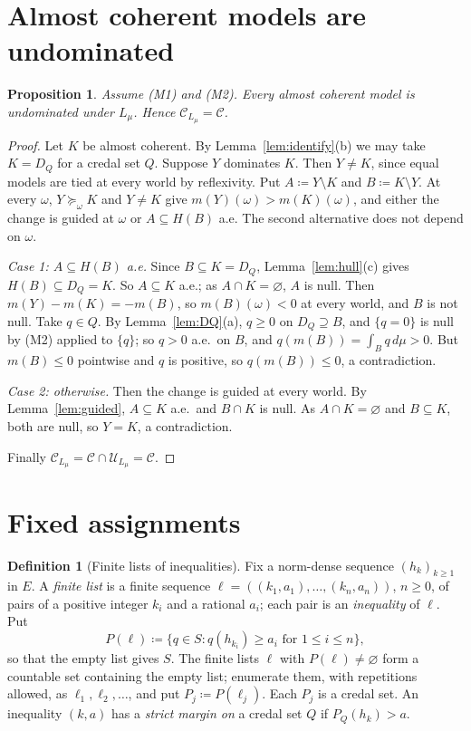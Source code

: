 \documentclass[11pt]{article}
\newtheorem{proposition}[theorem]{Proposition}
\theoremstyle{definition}
\newtheorem{definition}[theorem]{Definition}
\newcommand{\C}{\mathcal C}
\newcommand{\U}{\mathcal U}
\newcommand{\Lmu}{L_\mu}
\begin{document}
\section{Almost coherent models are undominated}\label{sec:admissibility}

\begin{proposition}\label{prop:admissible}
Assume (M1) and (M2). Every almost coherent model is undominated under $\Lmu$. Hence $\C_{\Lmu}=\C$.
\end{proposition}
\begin{proof}
Let $K$ be almost coherent. By Lemma~\ref{lem:identify}(b) we may take $K=D_Q$ for a credal set $Q$. Suppose $Y$ dominates $K$. Then $Y\ne K$, since equal models are tied at every world by reflexivity. Put $A\coloneqq Y\setminus K$ and $B\coloneqq K\setminus Y$. At every $\omega$, $Y\succeq_\omega K$ and $Y\ne K$ give $m(Y)(\omega)>m(K)(\omega)$, and either the change is guided at $\omega$ or $A\subseteq H(B)$ a.e. The second alternative does not depend on $\omega$.

\emph{Case 1: $A\subseteq H(B)$ a.e.} Since $B\subseteq K=D_Q$, Lemma~\ref{lem:hull}(c) gives $H(B)\subseteq D_Q=K$. So $A\subseteq K$ a.e.; as $A\cap K=\varnothing$, $A$ is null. Then $m(Y)-m(K)=-m(B)$, so $m(B)(\omega)<0$ at every world, and $B$ is not null. Take $q\in Q$. By Lemma~\ref{lem:DQ}(a), $q\ge0$ on $D_Q\supseteq B$, and $\{q=0\}$ is null by (M2) applied to $\{q\}$; so $q>0$ a.e.\ on $B$, and $q(m(B))=\int_Bq\,d\mu>0$. But $m(B)\le0$ pointwise and $q$ is positive, so $q(m(B))\le0$, a contradiction.

\emph{Case 2: otherwise.} Then the change is guided at every world. By Lemma~\ref{lem:guided}, $A\subseteq K$ a.e.\ and $B\cap K$ is null. As $A\cap K=\varnothing$ and $B\subseteq K$, both are null, so $Y=K$, a contradiction.

Finally $\C_{\Lmu}=\C\cap\U_{\Lmu}=\C$.
\end{proof}

\section{Fixed assignments}\label{sec:assignments}

\begin{definition}[Finite lists of inequalities]\label{def:lists}
Fix a norm-dense sequence $(h_k)_{k\ge1}$ in $E$. A \emph{finite list} is a finite sequence $\ell=((k_1,a_1),\dots,(k_n,a_n))$, $n\ge0$, of pairs of a positive integer $k_i$ and a rational $a_i$; each pair is an \emph{inequality} of $\ell$. Put
\[
P(\ell)\coloneqq\{q\in S:q(h_{k_i})\ge a_i\text{ for }1\le i\le n\},
\]
so that the empty list gives $S$. The finite lists $\ell$ with $P(\ell)\ne\varnothing$ form a countable set containing the empty list; enumerate them, with repetitions allowed, as $\ell_1,\ell_2,\dots$, and put $P_j\coloneqq P(\ell_j)$. Each $P_j$ is a credal set. An inequality $(k,a)$ has a \emph{strict margin on} a credal set $Q$ if $P_Q(h_k)>a$.
\end{definition}
\end{document}
